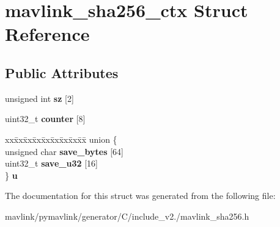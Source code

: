 \hypertarget{structmavlink__sha256__ctx}{}\section{mavlink\+\_\+sha256\+\_\+ctx Struct Reference}
\label{structmavlink__sha256__ctx}
\subsection*{Public Attributes}
\begin{DoxyCompactItemize}
\item 
\mbox{\label{structmavlink__sha256__ctx_ab9af7ea753e55df15d6909c1ed606aa8}} 
unsigned int {\bfseries sz} \mbox{[}2\mbox{]}
\item 
\mbox{\label{structmavlink__sha256__ctx_ac11ac388c0a250e0d72ff7613cb5c6d3}} 
uint32\+\_\+t {\bfseries counter} \mbox{[}8\mbox{]}
\item 
\mbox{\label{structmavlink__sha256__ctx_acd289a78523bdeb912acdccd72c7e2d4}} 
\begin{tabbing}
xx\=xx\=xx\=xx\=xx\=xx\=xx\=xx\=xx\=\kill
union \{\\
\>unsigned char {\bfseries save\_bytes} \mbox{[}64\mbox{]}\\
\>uint32\_t {\bfseries save\_u32} \mbox{[}16\mbox{]}\\
\} {\bfseries u}\\

\end{tabbing}\end{DoxyCompactItemize}


The documentation for this struct was generated from the following file\+:\begin{DoxyCompactItemize}
\item 
mavlink/pymavlink/generator/\+C/include\+\_\+v2./mavlink\+\_\+sha256.\+h\end{DoxyCompactItemize}
